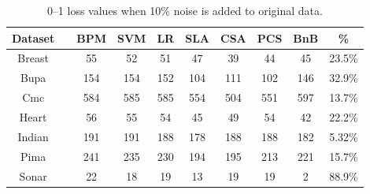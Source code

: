 \begin{table}[htbp!]
\centering
\begin{tabular}{|cc|  ccc|cccc|c|}
\hline\hline
{\bf Dataset} && {\bf BPM} & {\bf SVM} & {\bf LR} & {\bf SLA} & {\bf CSA} & {\bf PCS} & {\bf BnB} & {\bf \% }\\
\hline
Breast 	&& 55 & 52 & 51 & 47 		& 39 & 44 & 45 & 23.5\%\\  
Bupa 	&& 154 & 154 & 152 & 104 	& 111 & 102 & 146 & 32.9\%\\   
Cmc 		&& 584 & 585 & 585 & 554 	& 504 & 551 & 597 & 13.7\%\\   
Heart 	&& 56 & 55 & 54 & 45 		& 49 & 54 & 42 & 22.2\%\\  
Indian 	&& 191 & 191 & 188 & 178 	& 188 & 188 & 182 & 5.32\%\\    
Pima 	&& 241 & 235 & 230 & 194 	& 195 & 213 & 221 & 15.7\%\\    
Sonar 	&& 22 & 18 & 19 & 13 		& 19 & 19 & 2 & 88.9\%\\ 
\hline\hline
\end{tabular}
\caption{0--1 loss values when 10\% noise is added to original data.} 
\label{tab:losses1noise}
\end{table}

